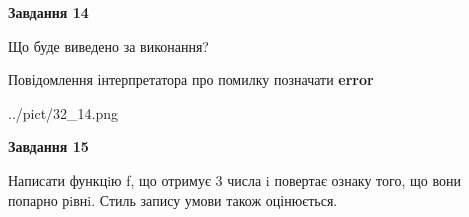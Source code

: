 \documentclass[11pt, ukrainian]{article}
\begin{document}
{\begin {large}
{\begin {center}\textbf{Завдання 14}\end {center}}\par
Що буде виведено за виконання? \par
Повідомлення інтерпретатора про помилку позначати \textbf{error}

\begin{center}
	{../pict/32_14.png}
\end{center}
\newpage

{\begin {center}\textbf{Завдання 15}\end {center}}\par

Написати функцiю f, що отримує 3 числа i повертає ознаку того, що вони попарно рiвнi. Стиль запису умови також оцінюється.\par
\newpage

\end {large}}
\end{document}
